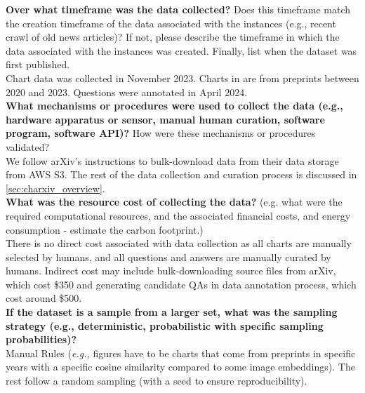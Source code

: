     \textcolor{\sectioncolor}{\textbf{Over what timeframe was the data collected?
    }
    Does this timeframe match the creation timeframe of the data associated
    with the instances (e.g., recent crawl of old news articles)? If not,
    please describe the timeframe in which the data associated with the
    instances was created. Finally, list when the dataset was first published.
    } \\
    Chart data was collected in November 2023. Charts in \ours{} are from preprints between 2020 and 2023. Questions were annotated in April 2024. \\
    
    \textcolor{\sectioncolor}{\textbf{What mechanisms or procedures were used to collect the data (e.g., hardware
    apparatus or sensor, manual human curation, software program, software
    API)?
    }
    How were these mechanisms or procedures validated?
    } \\
    We follow arXiv's instructions to bulk-download data from their data storage from AWS S3. The rest of the data collection and curation process is discussed in \cref{sec:charxiv_overview}. \\
    
    \textcolor{\sectioncolor}{\textbf{What was the resource cost of collecting the data?
    }
    (e.g. what were the required computational resources, and the associated
    financial costs, and energy consumption - estimate the carbon footprint.)} \\
    There is no direct cost associated with data collection as all charts are manually selected by humans, and all questions and answers are manually curated by humans. Indirect cost may include bulk-downloading source files from arXiv, which cost \$350 and generating candidate QAs in data annotation process, which cost around \$500.\\
    
    \textcolor{\sectioncolor}{\textbf{If the dataset is a sample from a larger set, what was the sampling
    strategy (e.g., deterministic, probabilistic with specific sampling
    probabilities)?
    }
    } \\
    Manual Rules (\textit{e.g.,} figures have to be charts that come from preprints in specific years with a specific cosine similarity compared to some image embeddings). The rest follow a random sampling (with a seed to ensure reproducibility). \\
    

